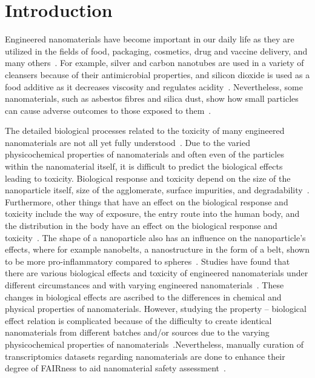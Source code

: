 \documentclass[ijms,article,submit,moreauthors,pdftex]{Definitions/mdpi}
\begin{document}
\section{Introduction}

Engineered nanomaterials have become important in our daily life as they are utilized in the fields of food, packaging, cosmetics, drug and vaccine delivery, and many others~\cite{Ray2009}. For example, silver and carbon nanotubes are used in a variety of cleansers because of their antimicrobial properties, and silicon dioxide is used as a food additive as it decreases viscosity and regulates acidity~\cite{Shin2015}. Nevertheless, some nanomaterials, such as asbestos fibres and silica dust, show how small particles can cause adverse outcomes to those exposed to them~\cite{Visona2018,Markowitz2015,Chen2012,Arnoldussen2019}.

The detailed biological processes related to the toxicity of many engineered nanomaterials are not all yet fully understood~\cite{Podila2012,Bahadar2016}. Due to the varied physicochemical properties of nanomaterials and often even of the particles within the nanomaterial itself, it is difficult to predict the biological effects leading to toxicity. Biological response and toxicity depend on the size of the nanoparticle itself, size of the agglomerate, surface impurities, and degradability~\cite{DeStefano2012}. Furthermore, other things that have an effect on the biological response and toxicity include the way of exposure, the entry route into the human body, and the distribution in the body have an effect on the biological response and toxicity~\cite{Shin2015}. The shape of a nanoparticle also has an influence on the nanoparticle’s effects, where for example nanobelts, a nanostructure in the form of a belt, shown to be more pro-inflammatory compared to spheres~\cite{Silva2013}. Studies have found that there are various biological effects and toxicity of engineered nanomaterials under different circumstances and with varying engineered nanomaterials~\cite{Ray2009,Atha2017,Donaldson2003,Sung2008,EbabeElle2013}. These changes in biological effects are ascribed to the differences in chemical and physical properties of nanomaterials. However, studying the property – biological effect relation is complicated because of the difficulty to create identical nanomaterials from different batches and/or sources due to the varying physicochemical properties of nanomaterials~\cite{Mulhopt2018}.Nevertheless, manually curation of transcriptomics datasets regarding nanomaterials are done to enhance their degree of FAIRness to aid nanomaterial safety assessment~\cite{AliisaSaarimaki}.  
\end{document}
